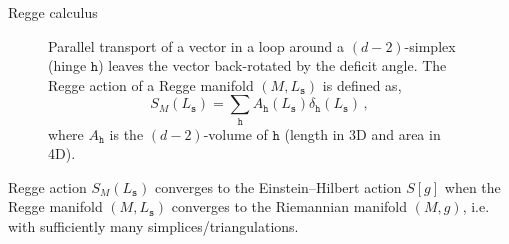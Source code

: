\documentclass[12pt,titlepage]{article}
\begin{document}
\begin{frame}{Regge calculus}
\begin{list}{\,}{\leftmargin=1em \itemindent=0em}
\begin{figure}[!ht]
\begin{minipage}{0.3\linewidth}
            \end{minipage}
            \begin{minipage}{0.7\linewidth}
                Parallel transport of a vector in a loop around a $(d-2)$-simplex (hinge $\mathtt{h}$) leaves the vector back-rotated by the deficit angle. The Regge action of a Regge manifold $(M,L_\mathtt{s})$ is defined as,
                \begin{equation}
                    S_M(L_\mathtt{s})=\sum_\mathtt{h}A_\mathtt{h}(L_\mathtt{s})\delta_\mathtt{h}(L_\mathtt{s})\,,
                \end{equation}
                where $A_\mathtt{h}$ is the $(d-2)$-volume of $\mathtt{h}$ (length in 3D and area in 4D).
            \end{minipage}
        \end{figure}\FloatBarrier
        \item<3-> Regge action $S_M(L_\mathtt{s})$ converges to the Einstein–Hilbert action $S[g]$ when the Regge manifold $(M,L_\mathtt{s})$ converges to the Riemannian manifold $(M,g)$, i.e. with sufficiently many simplices/triangulations.
    \end{list}
\end{frame}

\end{document}
